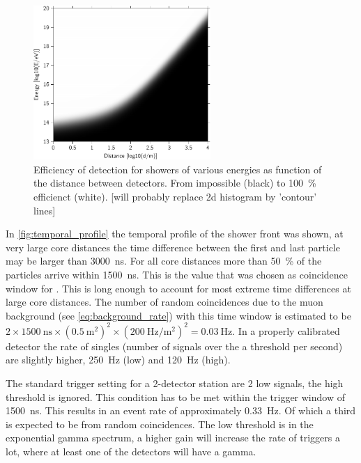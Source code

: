\begin{figure}
    \centering
    \includegraphics[width=0.6\textwidth]
                    {plots/station/efficiency_distance_energy}
    \caption{Efficiency of detection for showers of various energies as function of the distance between detectors. From impossible (black) to \SI{100}{\percent} efficienct (white). [will probably replace 2d histogram by 'contour' lines]}
    \label{fig:efficiency_distance_energy}
\end{figure}

In \cref{fig:temporal_profile} the temporal profile of the shower front was shown, at very large core distances the time difference between the first and last particle may be larger than \SI{3000}{\ns}. For all core distances more than \SI{50}{\percent} of the particles arrive within \SI{1500}{\ns}. This is the value that was chosen as coincidence window for \hisparc. This is long enough to account for most extreme time differences at large core distances. The number of random coincidences due to the muon background (see \cref{eq:background_rate}) with this time window is estimated to be $2 \times \SI{1500}{\ns} \times \left(\SI{0.5}{\meter\squared}\right)^2 \times \left(\SI{200}{\hertz\per\meter\squared}\right)^2 = \SI{0.03}{\hertz}$. In a properly calibrated detector the rate of singles (number of signals over the a threshold per second) are slightly higher, \SI{250}{\hertz} (low) and \SI{120}{\hertz} (high).

The standard trigger setting for a 2-detector station are 2 low signals, the high threshold is ignored. This condition has to be met within the trigger window of \SI{1500}{\ns}. This results in an event rate of approximately \SI{0.33}{\hertz}. Of which a third is expected to be from random coincidences. The low threshold is in the exponential gamma spectrum, a higher \pmt gain will increase the rate of triggers a lot, where at least one of the detectors will have a gamma.

